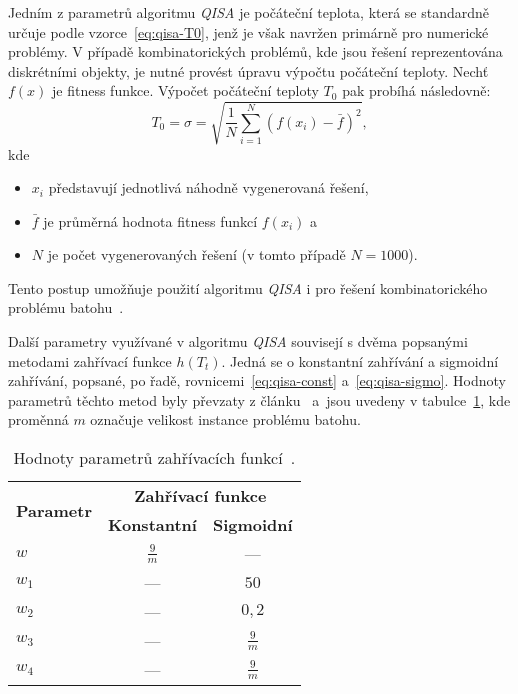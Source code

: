 Jedním z parametrů algoritmu \emph{QISA} je počáteční teplota, která se standardně určuje podle vzorce~\ref{eq:qisa-T0}, jenž je však navržen primárně pro numerické problémy. 
V případě kombinatorických problémů, kde jsou řešení reprezentována diskrétními objekty, je nutné provést úpravu výpočtu počáteční teploty. 
Nechť $f\left(x\right)$ je fitness funkce. Výpočet počáteční teploty $T_0$ pak probíhá následovně:
\begin{equation*}\label{eq:qisa-std}
    T_0 = \sigma = \sqrt{\frac{1}{N}\sum_{i=1}^{N}\left( f\left(x_i\right) - \bar{f}\right)^2},
\end{equation*}
kde
\begin{itemize}
    \item $x_i$ představují jednotlivá náhodně vygenerovaná řešení,
    \item $\bar{f}$ je průměrná hodnota fitness funkcí $f\left(x_i\right)$ a
    \item $N$ je počet vygenerovaných řešení (v tomto případě $N=1000$).
\end{itemize}
Tento postup umožňuje použití algoritmu \emph{QISA} i pro řešení kombinatorického problému batohu~\cite{qisa,FundamentalsOfProbability}. 

Další parametry využívané v algoritmu \emph{QISA} souvisejí s dvěma popsanými metodami zahřívací funkce $h\left(T_t\right)$. 
Jedná se o konstantní zahřívání a sigmoidní zahřívání, popsané, po řadě, rovnicemi~\ref{eq:qisa-const} a~\ref{eq:qisa-sigmo}. 
Hodnoty parametrů těchto metod byly převzaty z článku~\cite{qisa} a~jsou uvedeny v tabulce~\ref{tab:qisa-heating-params}, kde proměnná $m$ označuje velikost instance problému batohu.
\begin{table}[ht]
    \centering
    \begin{tabular}{lcc}
      \toprule
      \multirow{2}{*}{\textbf{Parametr}}  & \multicolumn{2}{c}{\textbf{Zahřívací funkce}} \\
      \cmidrule(lr){2-3}
            & \textbf{Konstantní}  & \textbf{Sigmoidní} \\
      \midrule
      $w$   & $\frac{9}{m}$        & ---                \\[1ex]
      $w_1$ & ---                  & $50$               \\[1ex]
      $w_2$ & ---                  & $0,2$              \\[1ex]
      $w_3$ & ---                  & $\frac{9}{m}$      \\[1ex]
      $w_4$ & ---                  & $\frac{9}{m}$      \\
      \bottomrule
    \end{tabular}
    \caption{Hodnoty parametrů zahřívacích funkcí~\cite{qisa}.}
    \label{tab:qisa-heating-params}
\end{table}

